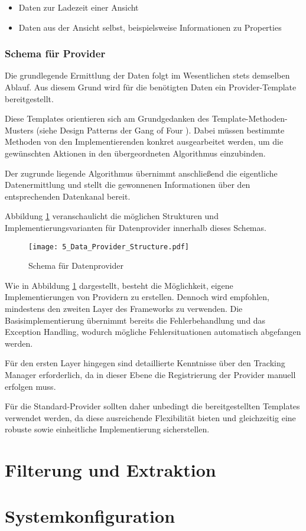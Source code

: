 \begin{itemize}
    \item Daten zur Ladezeit einer Ansicht
    \item Daten aus der Ansicht selbst, beispielsweise Informationen zu Properties
\end{itemize}

\subsubsection{Schema für Provider}
Die grundlegende Ermittlung der Daten folgt im Wesentlichen stets demselben Ablauf. Aus diesem Grund wird für die benötigten Daten ein Provider-Template bereitgestellt.

Diese Templates orientieren sich am Grundgedanken des Template-Methoden-Musters (siehe Design Patterns der Gang of Four \cite{gamma1995design}). Dabei müssen bestimmte Methoden von den Implementierenden konkret ausgearbeitet werden, um die gewünschten Aktionen in den übergeordneten Algorithmus einzubinden.

Der zugrunde liegende Algorithmus übernimmt anschließend die eigentliche Datenermittlung und stellt die gewonnenen Informationen über den entsprechenden Datenkanal bereit.

Abbildung \ref{fig:structure_data_provider} veranschaulicht die möglichen Strukturen und Implementierungsvarianten für Datenprovider innerhalb dieses Schemas.

\begin{figure}[H]
\centering
\texttt{[image: 5\_Data\_Provider\_Structure.pdf]}
\caption{Schema für Datenprovider}
\label{fig:structure_data_provider}
\end{figure}

Wie in Abbildung \ref{fig:structure_data_provider} dargestellt, besteht die Möglichkeit, eigene Implementierungen von Providern zu erstellen. Dennoch wird empfohlen, mindestens den zweiten Layer des Frameworks zu verwenden. Die Basisimplementierung übernimmt bereits die Fehlerbehandlung und das Exception Handling, wodurch mögliche Fehlersituationen automatisch abgefangen werden.

Für den ersten Layer hingegen sind detaillierte Kenntnisse über den Tracking Manager erforderlich, da in dieser Ebene die Registrierung der Provider manuell erfolgen muss.

Für die Standard-Provider sollten daher unbedingt die bereitgestellten Templates verwendet werden, da diese ausreichende Flexibilität bieten und gleichzeitig eine robuste sowie einheitliche Implementierung sicherstellen.

\section{Filterung und Extraktion}
\label{sec:data_extraction_concept}

\section{Systemkonfiguration}
\label{sec:integration_concept}


